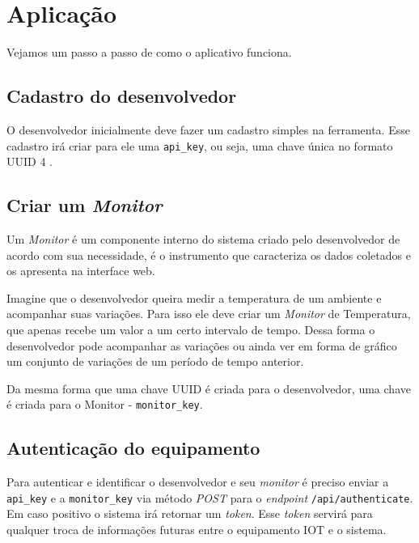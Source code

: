 \section{Aplicação}\label{aplicauxe7uxe3o}

Vejamos um passo a passo de como o aplicativo funciona.

\subsection{Cadastro do desenvolvedor}\label{cadastro-do-desenvolvedor}

O desenvolvedor inicialmente deve fazer um cadastro simples na
ferramenta. Esse cadastro irá criar para ele uma \texttt{api\_key}, ou
seja, uma chave única no formato UUID 4 \cite{rfc4122:2005}.

\subsection{Criar um \emph{Monitor}}\label{criar-um-monitor}

Um \emph{Monitor} é um componente interno do sistema criado pelo
desenvolvedor de acordo com sua necessidade, é o instrumento que
caracteriza os dados coletados e os apresenta na interface web.

Imagine que o desenvolvedor queira medir a temperatura de um ambiente e
acompanhar suas variações. Para isso ele deve criar um \emph{Monitor} de
Temperatura, que apenas recebe um valor a um certo intervalo de tempo.
Dessa forma o desenvolvedor pode acompanhar as variações ou ainda ver em
forma de gráfico um conjunto de variações de um período de tempo
anterior.

Da mesma forma que uma chave UUID é criada para o desenvolvedor, uma
chave é criada para o Monitor - \texttt{monitor\_key}.

\subsection{Autenticação do
equipamento}\label{autenticauxe7uxe3o-do-equipamento}

Para autenticar e identificar o desenvolvedor e seu \emph{monitor} é
preciso enviar a \texttt{api\_key} e a \texttt{monitor\_key} via método
\emph{POST} para o \emph{endpoint} \texttt{/api/authenticate}. Em caso
positivo o sistema irá retornar um \emph{token}. Esse \emph{token}
servirá para qualquer troca de informações futuras entre o equipamento
IOT e o sistema.

